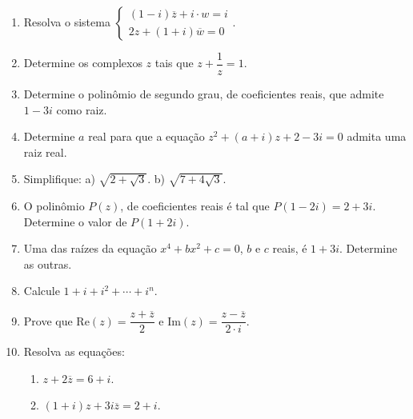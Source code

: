 \documentclass[12pt,a4paper]{article}
\newcommand{\espacoresposta}[1]{%
  \vspace{#1}%
}
\begin{document}
\begin{enumerate}[label=\textbf{\arabic*)}, leftmargin=*]
    \item Resolva o sistema $\begin{cases} (1 - i)\overline{z} + i \cdot w = i \\ 2z + (1 + i)\overline{w} = 0 \end{cases}$.

    \item Determine os complexos $z$ tais que $z + \dfrac{1}{z} = 1$.


    \item Determine o polinômio de segundo grau, de coeficientes reais, que admite $1 - 3i$ como raiz.

    \item Determine $a$ real para que a equação $z^2 + (a + i)z + 2 - 3i = 0$ admita uma raiz real.

    \item Simplifique: a) $\sqrt{2 + \sqrt{3}}$. \quad b) $\sqrt{7 + 4\sqrt{3}}$.

    \item O polinômio $P(z)$, de coeficientes reais é tal que $P(1 - 2i) = 2 + 3i$. Determine o valor de $P(1 + 2i)$.

    \item Uma das raízes da equação $x^4 + bx^2 + c = 0$, $b$ e $c$ reais, é $1 + 3i$. Determine as outras.


    \item Calcule $1 + i + i^2 + \cdots + i^n$.

    \item Prove que $\text{Re}(z) = \dfrac{z + \overline{z}}{2}$ e $\text{Im}(z) = \dfrac{z - \overline{z}}{2 \cdot i}$.

    \item Resolva as equações: 
    \begin{enumerate}[label=\alph*)]
        \item $z + 2\overline{z} = 6 + i$.
        \item $(1 + i)z + 3i\overline{z} = 2 + i$.
    \end{enumerate}

\end{enumerate}

\end{document}
